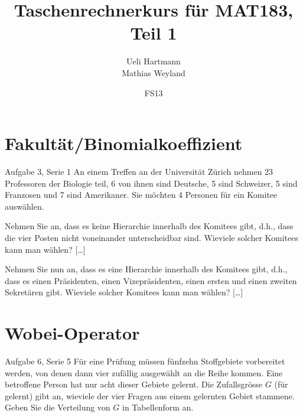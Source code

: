 \documentclass{beamer}
\title{Taschenrechnerkurs für MAT183, Teil 1}
\author{Ueli Hartmann\\Mathias Weyland}
\date{FS13}
\begin{document}
\frame{\maketitle}


\section{Fakultät/Binomialkoeffizient}

\begin{frame}{Aufgabe 3, Serie 1}
An einem Treffen an der Universität Zürich nehmen 23 Professoren der Biologie teil, 6 von
ihnen sind Deutsche, 5 sind Schweizer, 5 sind Franzosen und 7 sind Amerikaner.
Sie möchten 4 Personen für ein Komitee auswählen.

\begin{outline}
\item Nehmen Sie an, dass es keine Hierarchie innerhalb des Komitees gibt, d.h., dass die
vier Posten nicht voneinander unterscheidbar sind. Wieviele solcher Komitees kann
man wählen? [\ldots]\pause
\item Nehmen Sie nun an, dass es eine Hierarchie innerhalb des Komitees gibt, d.h., dass es
einen Präsidenten, einen Vizepräsidenten, einen ersten und einen zweiten
Sekretären gibt. Wieviele solcher Komitees kann man wählen? [\ldots]
\end{outline}
\end{frame}

\section{Wobei-Operator}
\begin{frame}{Aufgabe 6, Serie 5}
Für eine Prüfung müssen fünfzehn Stoffgebiete vorbereitet werden, von denen dann
vier zufällig ausgewählt an die Reihe kommen. Eine betroffene Person hat nur
acht dieser Gebiete gelernt. Die Zufallsgrösse $G$ (für gelernt) gibt an,
wieviele der vier Fragen aus einem gelernten Gebiet stammene. Geben Sie die
Verteilung von $G$ in Tabellenform an.
\end{frame}
\end{document}
